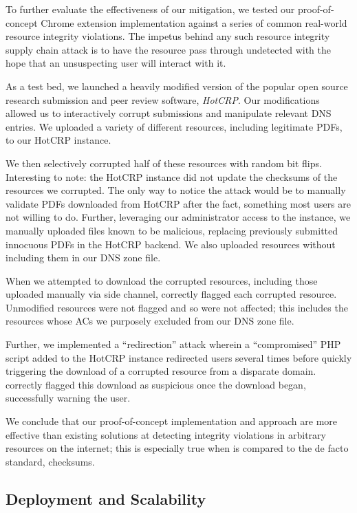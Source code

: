 To further evaluate the effectiveness of our mitigation, we tested our
proof-of-concept \SYSTEM{} Chrome extension implementation against a series of
common real-world resource integrity violations. The impetus behind any such
resource integrity supply chain attack is to have the resource pass through
undetected with the hope that an unsuspecting user will interact with it.

As a test bed, we launched a heavily modified version of the popular open source
research submission and peer review software, \emph{HotCRP}. Our modifications
allowed us to interactively corrupt submissions and manipulate relevant DNS
entries. We uploaded a variety of different resources, including legitimate
PDFs, to our HotCRP instance.

We then selectively corrupted half of these resources with random bit flips.
Interesting to note: the HotCRP instance did not update the checksums of the
resources we corrupted. The only way to notice the attack would be to manually
validate PDFs downloaded from HotCRP after the fact, something most users are
not willing to do. Further, leveraging our administrator access to the instance,
we manually uploaded files known to be malicious, replacing previously submitted
innocuous PDFs in the HotCRP backend. We also uploaded resources without
including them in our DNS zone file.

When we attempted to download the corrupted resources, including those uploaded
manually via side channel, \SYSTEM{} correctly flagged each corrupted resource.
Unmodified resources were not flagged and so were not affected; this includes
the resources whose ACs we purposely excluded from our DNS zone file.

Further, we implemented a ``redirection'' attack wherein a ``compromised'' PHP
script added to the HotCRP instance redirected users several times before
quickly triggering the download of a corrupted resource from a disparate domain.
\SYSTEM{} correctly flagged this download as suspicious once the download began,
successfully warning the user.

We conclude that our proof-of-concept \SYSTEM{} implementation and approach are
more effective than existing solutions at detecting integrity violations in
arbitrary resources on the internet; this is especially true when \SYSTEM{} is
compared to the de facto standard, checksums.

\subsection{Deployment and Scalability}

